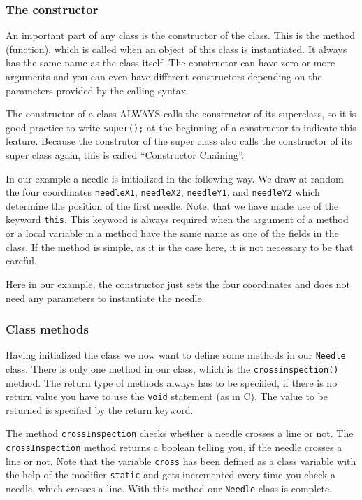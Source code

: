 \subsubsection{The constructor}
An important part of any class is the constructor of the class. This is
the method (function), which is called when an object of this
class is instantiated. It always has the same name as the class itself.
The constructor can have zero or more arguments and you can even
have different constructors depending on the parameters provided by
the calling syntax.

The constructor of a class ALWAYS calls the constructor of its
superclass, so it is good practice to write \verb|super();| at the
beginning of a constructor to indicate this feature. Because the 
construtor of the super class also calls the constructor of its super
class again, this is called ``Constructor Chaining''.

In our example a needle is initialized in the following way. We draw
at random the four coordinates \verb|needleX1|, \verb|needleX2|,
\verb|needleY1|, and \verb|needleY2| which determine the position of
the first needle. Note, that we have made use of the keyword
\verb|this|.
This keyword is always required when the argument of a method
or a local variable in a method have the same name as one of the fields
in the class. If the method is simple, as it is the case here, it is
not necessary to be that careful.

Here in our example, the constructor just sets the four coordinates
and does not need any parameters to instantiate the needle.

\subsubsection{Class methods}
Having initialized the class we now want to define some methods in our
\verb|Needle| class. There is only one method in our class, which
is the \verb|crossinspection()| method.
The return type of methods always has to be specified, if
there is no return value you have to use the \verb|void| statement
(as in C). The value to be returned is specified by the return keyword.

The method \verb|crossInspection| checks whether
a needle crosses a line or not. The \verb|crossInspection| method
returns a boolean telling you, if the needle crosses a line or not.
Note that the variable \verb|cross| has
been defined as a class variable with the help of the modifier \verb|static|
and gets incremented every time you check a needle, which crosses a line.
With this method our \verb|Needle| class is complete.

